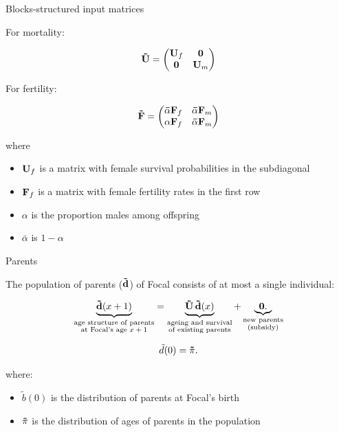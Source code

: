 ﻿\documentclass{beamer}
\begin{document}
\begin{frame}{Blocks-structured input matrices}

For mortality: 

\begin{equation*}
    {\bf \tilde{U}} = \begin{pmatrix}
    {\bf U}_f & {\bf 0} \\
    {\bf 0} & {\bf U}_m
    \end{pmatrix}
\end{equation*}

\vspace{1cm}

For fertility:

\begin{equation*}
    {\bf \tilde{F}} = \begin{pmatrix}
    {\bf \bar{\alpha} F}_f & {\bf \bar{\alpha} F}_m \\
    {\bf \alpha F}_f & {\bf \bar{\alpha} F}_m
    \end{pmatrix}
\end{equation*}

    where
    \begin{itemize}
        \item ${\bf U}_f$ is a matrix with female survival probabilities in the subdiagonal
        \item ${\bf F}_f$ is a matrix with female fertility rates in the first row 
        \item $\alpha$ is the proportion males among offspring
        \item $\bar{\alpha}$ is $1-\alpha$
    \end{itemize}
\end{frame}

\begin{frame}{Parents}

The population of parents ($\bf \tilde{d}$) of Focal consists of at most a single
individual:

    \begin{equation}
    	\underbrace{{\bf \tilde{d}}(x+1)}_{\substack{\text{age structure of parents}\\ \text{at Focal's age $x+1$}}} = 	
    \underbrace{{\bf \tilde{U} \, \tilde{d}}(x)}_{\substack{\text{ageing and survival}\\ \text{of existing parents}}}
    + 	\underbrace{	{\bf 0}.}_{\substack{\text{new parents}\\ \text{(subsidy)}}}
\end{equation}

\begin{equation*}
    \tilde{d}(0) = {\bf \tilde{\pi}}.
\end{equation*}

where:
\begin{itemize}
    \item $\tilde{b}(0)$ is the distribution of parents at Focal's birth
    \item ${\bf \tilde{\pi}}$ is the distribution of ages of parents in the population
\end{itemize}
\end{frame}
\end{document}
